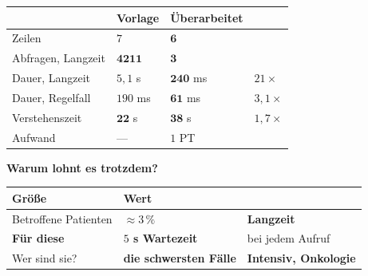 \begin{merksatz}
\begin{center}
{\small
\renewcommand{\arraystretch}{1.45}
\begin{tabular}{@{}P{2.8cm}P{2.0cm}P{2.2cm}P{2.0cm}@{}}
\toprule
& \textbf{Vorlage} & \textbf{Überarbeitet} & \\
\midrule
Zeilen & $7$ & $\mathbf{6}$ & \\
Abfragen, Langzeit & $\mathbf{4211}$ & $\mathbf{3}$ & \\
Dauer, Langzeit & $5{,}1$ s & $\mathbf{240}$ ms & $21\times$\\
Dauer, Regelfall & $190$ ms & $\mathbf{61}$ ms & $3{,}1\times$\\
Verstehenszeit & $\mathbf{22}$ s & $\mathbf{38}$ s & \textcolor{akzent}{$1{,}7\times$}\\
Aufwand & --- & $1$ PT & \\
\bottomrule
\end{tabular}}
\end{center}

\begin{center}
\begin{minipage}{0.88\textwidth}
\end{minipage}
\end{center}

\textbf{Warum lohnt es trotzdem?}

\begin{center}
\renewcommand{\arraystretch}{1.45}
\begin{tabular}{@{}P{2.8cm}P{2.2cm}P{2.6cm}@{}}
\toprule
\textbf{Größe} & \textbf{Wert} & \\
\midrule
Betroffene Patienten & $\approx3\,\%$ & \textbf{Langzeit}\\
\textbf{Für diese} & \textcolor{akzent}{\textbf{$5$ s Wartezeit}} & \textcolor{akzent}{bei jedem Aufruf}\\
Wer sind sie? & \textbf{die schwersten Fälle} & \textcolor{akzent}{\textbf{Intensiv, Onkologie}}\\
\bottomrule
\end{tabular}
\end{center}

\begin{center}
\end{center}
\end{merksatz}

